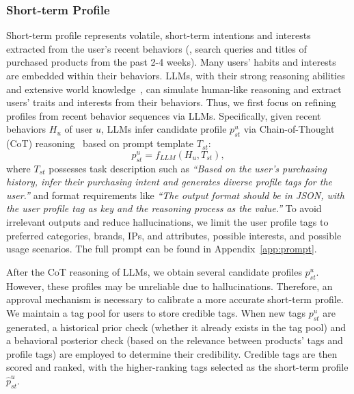 \subsubsection{Short-term Profile} Short-term profile represents volatile, short-term intentions and interests extracted from the user's recent behaviors (\eg, search queries and titles of purchased products from the past 2-4 weeks). Many users' habits and interests are embedded within their behaviors. LLMs, with their strong reasoning abilities and extensive world knowledge~\cite{wei2022chain,llama}, can simulate human-like reasoning and extract users'  traits and interests from their behaviors. Thus, we first focus on refining profiles from recent behavior sequences via LLMs. Specifically, given recent behaviors $H_u$ of user $u$, LLMs infer candidate profile $p^u_{st}$ via Chain-of-Thought (CoT) reasoning~\cite{wei2022chain} based on prompt template $T_{st}$:
\begin{equation}
    p^u_{st} = f_{LLM}(H_u, T_{st}),
\label{eq:llm_recent}
\end{equation}
where $T_{st}$ possesses task description such as \textit{``Based on the user's purchasing history, infer their purchasing intent and generates diverse profile tags for the user.''} and format requirements like \textit{``The output format should be in JSON, with the user profile tag as key and the reasoning process as the value.''} To avoid irrelevant outputs and reduce hallucinations, we limit the user profile tags to preferred categories, brands, IPs, and attributes, possible interests, and possible usage scenarios. The full prompt can be found in Appendix~\ref{app:prompt}.

After the CoT reasoning of LLMs, we obtain several candidate profiles $p^u_{st}$. However, these profiles may be unreliable due to hallucinations. Therefore, an approval mechanism is necessary to calibrate a more accurate short-term profile. We maintain a tag pool for users to store credible tags. When new tags $p^u_{st}$ are generated, a historical prior check (whether it already exists in the tag pool) and a behavioral posterior check (based on the relevance between products' tags and profile tags) are employed to determine their credibility. Credible tags are then scored and ranked, with the higher-ranking tags selected as the short-term profile $\hat{p}^u_{st}$. 



